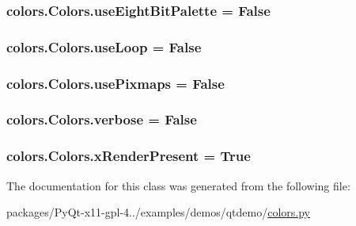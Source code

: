\subsubsection[{use\+Eight\+Bit\+Palette}]{\setlength{\rightskip}{0pt plus 5cm}colors.\+Colors.\+use\+Eight\+Bit\+Palette = {\bf False}\hspace{0.3cm}{\ttfamily [static]}}\label{classcolors_1_1Colors_a7b80d4e45b227fae9e803d6cf5c9ec7e}
\hypertarget{classcolors_1_1Colors_a7fbc7d0fdb2296c63d41c64c9ee18bf2}{}
\subsubsection[{use\+Loop}]{\setlength{\rightskip}{0pt plus 5cm}colors.\+Colors.\+use\+Loop = {\bf False}\hspace{0.3cm}{\ttfamily [static]}}\label{classcolors_1_1Colors_a7fbc7d0fdb2296c63d41c64c9ee18bf2}
\hypertarget{classcolors_1_1Colors_a8b60b432155e88d9f4eab75637d805bb}{}
\subsubsection[{use\+Pixmaps}]{\setlength{\rightskip}{0pt plus 5cm}colors.\+Colors.\+use\+Pixmaps = {\bf False}\hspace{0.3cm}{\ttfamily [static]}}\label{classcolors_1_1Colors_a8b60b432155e88d9f4eab75637d805bb}
\hypertarget{classcolors_1_1Colors_ad4d55b14e26e72bb9d353cb5ab9ba902}{}
\subsubsection[{verbose}]{\setlength{\rightskip}{0pt plus 5cm}colors.\+Colors.\+verbose = {\bf False}\hspace{0.3cm}{\ttfamily [static]}}\label{classcolors_1_1Colors_ad4d55b14e26e72bb9d353cb5ab9ba902}
\hypertarget{classcolors_1_1Colors_ae01650ff4e75ddfebc37bdb069bc1b6d}{}
\subsubsection[{x\+Render\+Present}]{\setlength{\rightskip}{0pt plus 5cm}colors.\+Colors.\+x\+Render\+Present = {\bf True}\hspace{0.3cm}{\ttfamily [static]}}\label{classcolors_1_1Colors_ae01650ff4e75ddfebc37bdb069bc1b6d}


The documentation for this class was generated from the following file\+:\begin{DoxyCompactItemize}
\item 
packages/\+Py\+Qt-\/x11-\/gpl-\/4../examples/demos/qtdemo/\hyperlink{colors_8py}{colors.\+py}\end{DoxyCompactItemize}
